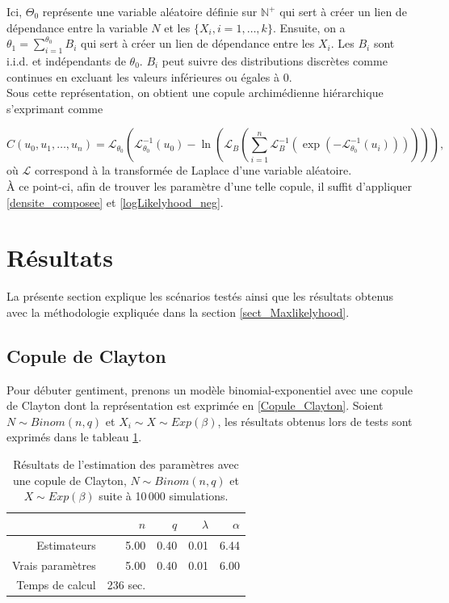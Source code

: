 \documentclass{article}
\begin{document}
	Ici, $\Theta_0$ représente une variable aléatoire définie sur $\mathbb{N}^+$ qui sert à créer un lien de dépendance entre la variable $N$ et les $\{X_i, i=1,\dots , k\}$. Ensuite, on a $\theta_1 = \sum_{i=1}^{\theta_0} B_i$ qui sert à créer un lien de dépendance entre les $X_i$. Les $B_i$ sont i.i.d. et indépendants de $\theta_0$. $B_i$ peut suivre des distributions discrètes comme continues en excluant les valeurs inférieures ou égales à 0. \\
	
	Sous cette représentation, on obtient une copule archimédienne hiérarchique s'exprimant comme
	
	\begin{equation}
	C(u_0, u_1, \dots, u_n) =
		\mathscr{L}_{\theta_0} \left(
			\mathscr{L}_{\theta_0}^{-1}(u_0) - \ln \left( 
				\mathscr{L}_B  \left(
					\sum_{i=1}^{n} \mathscr{L}_{B}^{-1} \left(
					 \exp \left(
					  - \mathscr{L}_{\theta_0}^{-1}(u_i) 
					  \right) \right)\right)\right)\right),
	\end{equation}
	où $\mathscr{L}$ correspond à la transformée de Laplace d'une variable aléatoire.\\
	
	À ce point-ci, afin de trouver les paramètre d'une telle copule, il suffit d'appliquer \eqref{densite_composee} et \eqref{logLikelyhood_neg}.
	
	\section{Résultats}
	La présente section explique les scénarios testés ainsi que les résultats obtenus avec la méthodologie expliquée dans la section \ref{sect_Maxlikelyhood}.
	
	\subsection{Copule de Clayton}
	Pour débuter gentiment, prenons un modèle binomial-exponentiel avec une copule de Clayton dont la représentation est exprimée en \eqref{Copule_Clayton}.
	Soient $N \sim Binom(n,q)$ et $X_i \sim X \sim Exp(\beta)$, les résultats obtenus lors de tests sont exprimés dans le tableau \ref{tbl_Clayton_Binom}.
	
	\begin{table}[H]
		\centering
		\begin{tabular}{rrrrr}
			\hline
			& $n$ & $q$ & $\lambda$ & $\alpha$ \\ 
			\hline
			Estimateurs & 5.00 & 0.40 & 0.01 & 6.44 \\ 
			Vrais paramètres & 5.00 & 0.40 & 0.01 & 6.00 \\ 
			\hline
			Temps de calcul & 236 sec.\\
			\hline
		\end{tabular}
		\renewcommand{\tablename}{Tableau}
		\caption[Estimations avec une copule de Clayton et $N\sim Binomiale$]{Résultats de l'estimation des paramètres avec une copule de Clayton, $N\sim Binom(n,q)$ et $X \sim Exp(\beta)$ suite à 10\,000 simulations.} \label{tbl_Clayton_Binom}
	\end{table}
	
\end{document}
